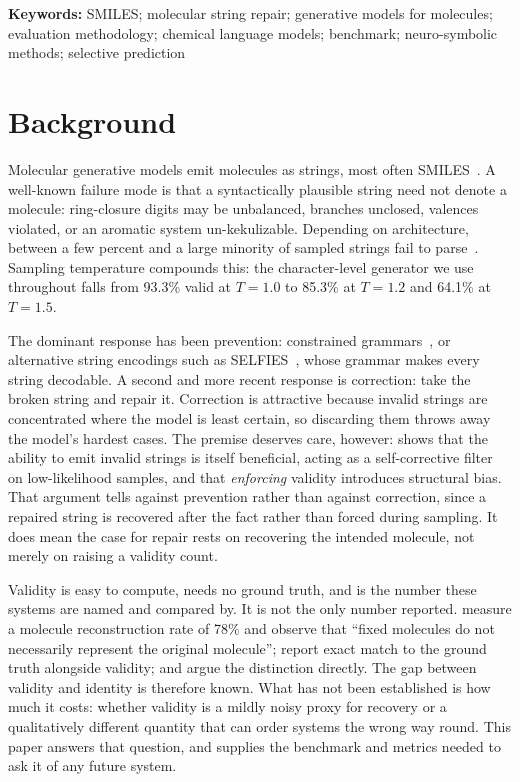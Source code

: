 \documentclass[conference]{IEEEtran}
\begin{document}
\vspace{0.5em}
\noindent\textbf{Keywords:} SMILES; molecular string repair; generative models
for molecules; evaluation methodology; chemical language models; benchmark;
neuro-symbolic methods; selective prediction

\section{Background}

Molecular generative models emit molecules as strings, most often
SMILES~\citep{weininger1988smiles}. A well-known failure mode is that a
syntactically plausible string need not denote a molecule: ring-closure digits
may be unbalanced, branches unclosed, valences violated, or an aromatic system
un-kekulizable. Depending on architecture, between a few percent and a large
minority of sampled strings fail to
parse~\citep{brown2019guacamol,polykovskiy2020moses}. Sampling temperature
compounds this: the character-level generator we use throughout falls from
93.3\% valid at $T{=}1.0$ to 85.3\% at $T{=}1.2$ and 64.1\% at $T{=}1.5$.

The dominant response has been prevention: constrained
grammars~\citep{kusner2017grammar,dai2018syntax}, or alternative string
encodings such as SELFIES~\citep{krenn2020selfies}, whose grammar makes every
string decodable. A second and more recent response is correction: take the
broken string and repair it. Correction is attractive because invalid strings are
concentrated where the model is least certain, so discarding them throws away the
model's hardest cases. The premise deserves care, however:
\citet{skinnider2024invalid} shows that the ability to emit invalid strings is
itself beneficial, acting as a self-corrective filter on low-likelihood samples,
and that \emph{enforcing} validity introduces structural bias. That argument
tells against prevention rather than against correction, since a repaired string
is recovered after the fact rather than forced during sampling. It does mean the
case for repair rests on recovering the intended molecule, not merely on raising
a validity count.

Validity is easy to compute, needs no ground truth, and is the number these
systems are named and compared by. It is not the only number reported.
\citet{schoenmaker2023uncorrupt} measure a molecule reconstruction rate of 78\%
and observe that ``fixed molecules do not necessarily represent the original
molecule''; \citet{smiself2025} report exact match to the ground truth alongside
validity; and \citet{amrec} argue the distinction directly. The gap between
validity and identity is therefore known. What has not been established is how
much it costs: whether validity is a mildly noisy proxy for recovery or a
qualitatively different quantity that can order systems the wrong way round.
This paper answers that question, and supplies the benchmark and metrics needed
to ask it of any future system.
\end{document}
